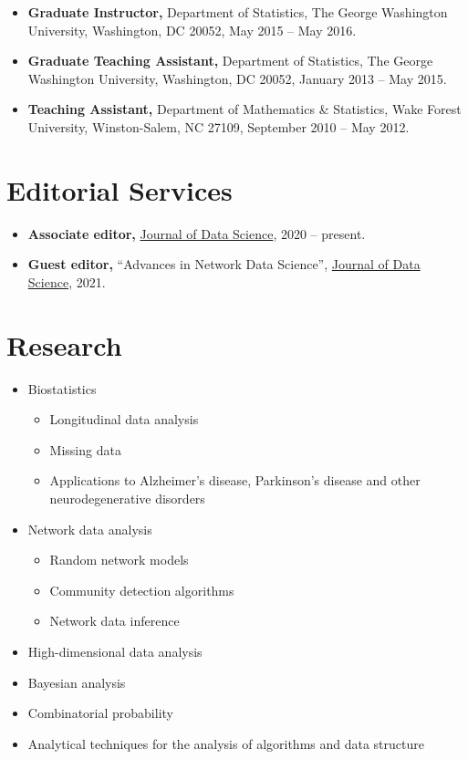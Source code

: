 \documentclass{res}
\begin{document}
\begin{resume}
\begin{itemize}
	\item {\bf Graduate Instructor,} Department of Statistics, The 
	George Washington University, Washington, DC 20052, May 2015 -- 
	May 
	2016.
	
	\item{\bf Graduate Teaching Assistant,} Department of 
	Statistics, The George Washington University, Washington, DC 
	20052, 
	January 2013 -- May 2015.
	
	\item{\bf Teaching Assistant,} Department of Mathematics \& 
	Statistics, Wake Forest University, Winston-Salem, NC 27109, 
	September 
	2010 -- May 2012.
\end{itemize}

\section{Editorial Services}
\begin{itemize}
	\item \textbf{Associate editor,} 
	\href{https://jds-online.org/journal/JDS}{Journal of Data 
		Science}, 2020 -- present.
	\item \textbf{Guest editor,} ``Advances in Network Data 
	Science'', \href{https://jds-online.org/journal/JDS}{Journal of 
		Data Science}, 2021.
\end{itemize}
	
\section{Research}
\begin{itemize}
	\item Biostatistics
	\begin{itemize}
		\item Longitudinal data analysis
		\item Missing data
		\item Applications to Alzheimer's disease, Parkinson's 
		disease and other neurodegenerative disorders
	\end{itemize}
	\item Network data analysis
	\begin{itemize}
		\item Random network models
		\item Community detection algorithms
		\item Network data inference
	\end{itemize}
	\item High-dimensional data analysis 
	\item Bayesian analysis
	\item Combinatorial probability
	\item Analytical techniques for the analysis of algorithms and 
	data structure
\end{itemize}


\end{resume}
\end{document}
